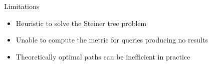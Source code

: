     
\begin{frame}{Limitations}
    \begin{itemize}
        \item Heuristic to solve the Steiner tree problem
        \item Unable to compute the metric for queries producing no results
        \item Theoretically optimal paths can be inefficient in practice
    \end{itemize}
\end{frame}